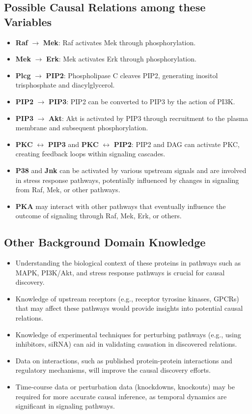 \documentclass{article}
\begin{document}
\subsection{Possible Causal Relations among these Variables}

\begin{itemize}
    \item \textbf{Raf} $\rightarrow$ \textbf{Mek}: Raf activates Mek through phosphorylation.
    \item \textbf{Mek} $\rightarrow$ \textbf{Erk}: Mek activates Erk through phosphorylation.
    \item \textbf{Plcg} $\rightarrow$ \textbf{PIP2}: Phospholipase C cleaves PIP2, generating inositol trisphosphate and diacylglycerol.
    \item \textbf{PIP2} $\rightarrow$ \textbf{PIP3}: PIP2 can be converted to PIP3 by the action of PI3K.
    \item \textbf{PIP3} $\rightarrow$ \textbf{Akt}: Akt is activated by PIP3 through recruitment to the plasma membrane and subsequent phosphorylation.
    \item \textbf{PKC} $\leftrightarrow$ \textbf{PIP3} and \textbf{PKC} $\leftrightarrow$ \textbf{PIP2}: PIP2 and DAG can activate PKC, creating feedback loops within signaling cascades.
    \item \textbf{P38} and \textbf{Jnk} can be activated by various upstream signals and are involved in stress response pathways, potentially influenced by changes in signaling from Raf, Mek, or other pathways.
    \item \textbf{PKA} may interact with other pathways that eventually influence the outcome of signaling through Raf, Mek, Erk, or others.
\end{itemize}

\subsection{Other Background Domain Knowledge}

\begin{itemize}
    \item Understanding the biological context of these proteins in pathways such as MAPK, PI3K/Akt, and stress response pathways is crucial for causal discovery.
    \item Knowledge of upstream receptors (e.g., receptor tyrosine kinases, GPCRs) that may affect these pathways would provide insights into potential causal relations.
    \item Knowledge of experimental techniques for perturbing pathways (e.g., using inhibitors, siRNA) can aid in validating causation in discovered relations.
    \item Data on interactions, such as published protein-protein interactions and regulatory mechanisms, will improve the causal discovery efforts.
    \item Time-course data or perturbation data (knockdowns, knockouts) may be required for more accurate causal inference, as temporal dynamics are significant in signaling pathways.
\end{itemize}
\end{document}
